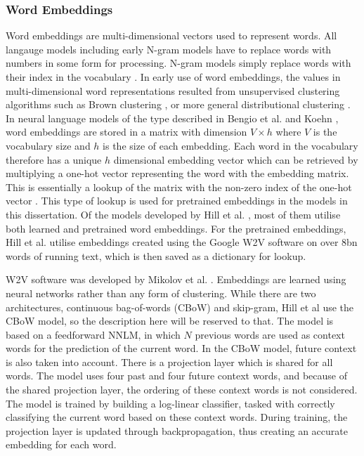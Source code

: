 \documentclass[11pt]{article}
\begin{document}
\begin{spacing}{1}
\subsubsection{Word Embeddings}
Word embeddings are multi-dimensional vectors used to represent words. All langauge models including early N-gram models have to replace words with numbers in some form for processing. N-gram models simply replace words with their index in the vocabulary \cite{mikolov2013efficient}. In early use of word embeddings, the values in multi-dimensional word representations resulted from unsupervised clustering algorithms such as Brown clustering \cite{Turian:2010:WRS:1858681.1858721}, or more general distributional clustering \cite{Pereira:1993:DCE:981574.981598}. In neural language models of the type described in Bengio et al. \citeyear{bengio2003neural} and Koehn \citeyear{DBLP:journals/corr/abs-1709-07809}, word embeddings are stored in a matrix with dimension $V \times h$ where $V$ is the vocabulary size and $h$ is the size of each embedding. Each word in the vocabulary therefore has a unique $h$ dimensional embedding vector which can be retrieved by multiplying a one-hot vector representing the word with the embedding matrix. This is essentially a lookup of the matrix with the non-zero index of the one-hot vector \cite[p.34]{DBLP:journals/corr/abs-1709-07809}. This type of lookup is used for pretrained embeddings in the models in this dissertation. Of the models developed by Hill et al. \citeyear{hill2015learning}, most of them utilise both learned and pretrained word embeddings. For the pretrained embeddings, Hill et al.  \citeyear{hill2015learning} utilise embeddings created using the Google W2V software \cite{mikolov2013efficient} on over 8bn words of running text, which is then saved as a dictionary for lookup.

W2V software was developed by Mikolov et al. \citeyear{mikolov2013efficient}. Embeddings are learned using neural networks rather than any form of clustering. While there are two architectures, continuous bag-of-words (CBoW) and skip-gram, Hill et al \citeyear{hill2015learning} use the CBoW model, so the description here will be reserved to that. The model is based on a feedforward NNLM,
in which $N$ previous words are used as context words for the prediction of the current word. In the CBoW model, future context is also taken into account. There is a projection layer which is shared for all words. The model uses four past and four future context words, and because of the shared projection layer, the ordering of these context words is not considered. The model is trained by building a log-linear classifier, tasked with correctly classifying the current word based on these context words. During training, the projection layer is updated through backpropagation, thus creating an accurate embedding for each word.


\end{spacing}
\end{document}
